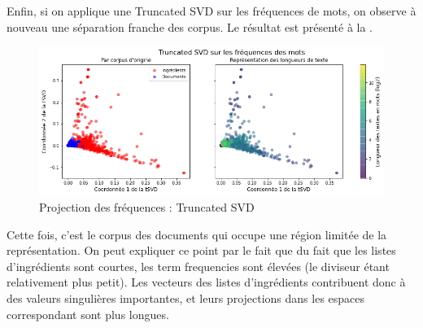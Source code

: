             Enfin, si on applique une Truncated SVD sur les fréquences de mots, on observe à nouveau une séparation franche des corpus.
            Le résultat est présenté à la .
            \begin{figure}[htbp]
                \begin{center}
                \includegraphics[width=0.9\linewidth]{img/tSVD_freq.png}
                \end{center}
                \caption{Projection des fréquences : Truncated SVD}
                \label{fig:tSVD_freq}
            \end{figure}
            Cette fois, c'est le corpus des documents qui occupe une région limitée de la représentation.
            On peut expliquer ce point par le fait que du fait que les listes d'ingrédients sont courtes, les \og term frequencies \fg sont élevées (le diviseur étant relativement plus petit).
            Les vecteurs des listes d'ingrédients contribuent donc à des valeurs singulières importantes, et leurs projections dans les espaces correspondant sont plus longues.
            
